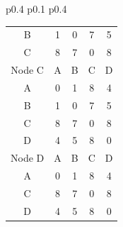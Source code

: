 \documentclass{article}
\begin{document}
\begin{tabular}{p{0.4\linewidth} p{0.1\linewidth} p{0.4\linewidth}}
\begin{tabular}{c|c|c|c|c}
        B & 1 & 0 & 7 & 5 \\
        C & 8 & 7 & 0 & 8 \\
        \hline
        \hline
        Node C & A & B & C & D \\
        \hline
        A & 0 & 1 & 8 & 4 \\
        B & 1 & 0 & 7 & 5 \\
        C & 8 & 7 & 0 & 8 \\
        D & 4 & 5 & 8 & 0 \\
        \hline
        \hline
        Node D & A & B & C & D \\
        \hline
        A & 0 & 1 &  8 & 4 \\
        C & 8 & 7 & 0 & 8 \\
        D & 4 & 5 & 8 & 0 \\
        \hline
    \end{tabular}


\end{tabular}
\end{document}
